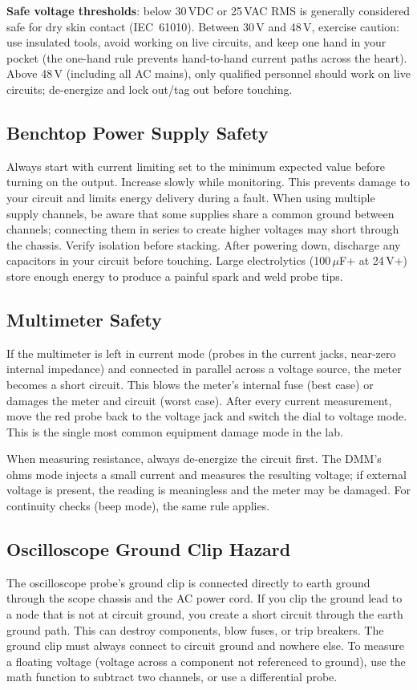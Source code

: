 \textbf{Safe voltage thresholds}: below 30\,VDC or 25\,VAC RMS is generally considered safe for dry skin contact (IEC~61010). Between 30\,V and 48\,V, exercise caution: use insulated tools, avoid working on live circuits, and keep one hand in your pocket (the one-hand rule prevents hand-to-hand current paths across the heart). Above 48\,V (including all AC mains), only qualified personnel should work on live circuits; de-energize and lock out/tag out before touching.

\subsection{Benchtop Power Supply Safety}
Always start with current limiting set to the minimum expected value before turning on the output. Increase slowly while monitoring. This prevents damage to your circuit and limits energy delivery during a fault. When using multiple supply channels, be aware that some supplies share a common ground between channels; connecting them in series to create higher voltages may short through the chassis. Verify isolation before stacking. After powering down, discharge any capacitors in your circuit before touching. Large electrolytics (100\,$\mu$F+ at 24\,V+) store enough energy to produce a painful spark and weld probe tips.

\subsection{Multimeter Safety}

\begin{warningbox}
If the multimeter is left in current mode (probes in the current jacks, near-zero internal impedance) and connected in parallel across a voltage source, the meter becomes a short circuit. This blows the meter's internal fuse (best case) or damages the meter and circuit (worst case). After every current measurement, move the red probe back to the voltage jack and switch the dial to voltage mode. This is the single most common equipment damage mode in the lab.
\end{warningbox}

When measuring resistance, always de-energize the circuit first. The DMM's ohms mode injects a small current and measures the resulting voltage; if external voltage is present, the reading is meaningless and the meter may be damaged. For continuity checks (beep mode), the same rule applies.

\subsection{Oscilloscope Ground Clip Hazard}
The oscilloscope probe's ground clip is connected directly to earth ground through the scope chassis and the AC power cord. If you clip the ground lead to a node that is not at circuit ground, you create a short circuit through the earth ground path. This can destroy components, blow fuses, or trip breakers. The ground clip must always connect to circuit ground and nowhere else. To measure a floating voltage (voltage across a component not referenced to ground), use the math function to subtract two channels, or use a differential probe.


